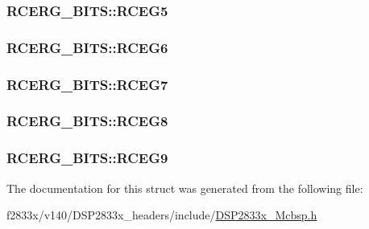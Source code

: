 \subsubsection[{R\+C\+E\+G5}]{ R\+C\+E\+R\+G\+\_\+\+B\+I\+T\+S\+::\+R\+C\+E\+G5}\label{struct_r_c_e_r_g___b_i_t_s_a262b2bc03ef92d7a0e7e827b1ba79d8b}
\hypertarget{struct_r_c_e_r_g___b_i_t_s_a8948b5cf67bda66b92a733c96e05a37e}{}
\subsubsection[{R\+C\+E\+G6}]{ R\+C\+E\+R\+G\+\_\+\+B\+I\+T\+S\+::\+R\+C\+E\+G6}\label{struct_r_c_e_r_g___b_i_t_s_a8948b5cf67bda66b92a733c96e05a37e}
\hypertarget{struct_r_c_e_r_g___b_i_t_s_add2a5c26eb3b0be17fa16aa8a5a8e3b3}{}
\subsubsection[{R\+C\+E\+G7}]{ R\+C\+E\+R\+G\+\_\+\+B\+I\+T\+S\+::\+R\+C\+E\+G7}\label{struct_r_c_e_r_g___b_i_t_s_add2a5c26eb3b0be17fa16aa8a5a8e3b3}
\hypertarget{struct_r_c_e_r_g___b_i_t_s_adfe00b9d31421c8737eb753c00d6a2ca}{}
\subsubsection[{R\+C\+E\+G8}]{ R\+C\+E\+R\+G\+\_\+\+B\+I\+T\+S\+::\+R\+C\+E\+G8}\label{struct_r_c_e_r_g___b_i_t_s_adfe00b9d31421c8737eb753c00d6a2ca}
\hypertarget{struct_r_c_e_r_g___b_i_t_s_ac33e6ea591d2dac9f10c66e28b856482}{}
\subsubsection[{R\+C\+E\+G9}]{ R\+C\+E\+R\+G\+\_\+\+B\+I\+T\+S\+::\+R\+C\+E\+G9}\label{struct_r_c_e_r_g___b_i_t_s_ac33e6ea591d2dac9f10c66e28b856482}


The documentation for this struct was generated from the following file\+:\begin{DoxyCompactItemize}
\item 
f2833x/v140/\+D\+S\+P2833x\+\_\+headers/include/\hyperlink{_d_s_p2833x___mcbsp_8h}{D\+S\+P2833x\+\_\+\+Mcbsp.\+h}\end{DoxyCompactItemize}
